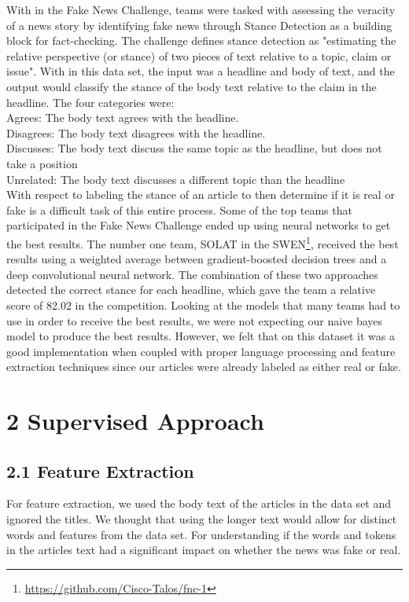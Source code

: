 \documentclass{neu_handout}
\begin{document}
With in the Fake News Challenge, teams were tasked with assessing the veracity of a news story by identifying fake news through Stance Detection as a building block for fact-checking. The challenge defines stance detection as "estimating the relative perspective (or stance) of two pieces of text relative to a topic, claim or issue". With in this data set, the input was a headline and body of text, and the output would classify the stance of the body text relative to the claim in the headline. The four categories were:\\
Agrees: The body text agrees with the headline.\\
Disagrees: The body text disagrees with the headline.\\
Discusses: The body text discuss the same topic as the headline, but does not take a position\\
Unrelated: The body text discusses a different topic than the headline\\

With respect to labeling the stance of an article to then determine if it is real or fake is a difficult task of this entire process. Some of the top teams that participated in the Fake News Challenge ended up using neural networks to get the best results. The number one team, SOLAT in the SWEN\footnote{\url{https://github.com/Cisco-Talos/fnc-1}}, received the best results using a weighted average between gradient-boosted decision trees and a deep convolutional neural network. The combination of these two approaches detected the correct stance for each headline, which gave the team a relative score of 82.02 in the competition. Looking at the models that many teams had to use in order to receive the best results, we were not expecting our naive bayes model to produce the best results. However, we felt that on this dataset it was a good implementation when coupled with proper language processing and feature extraction techniques since our articles were already labeled as either real or fake.

\section*{2 Supervised Approach}

\subsection*{2.1 Feature Extraction}

For feature extraction, we used the body text of the articles in the data set and ignored the titles. We thought that using the longer text would allow for distinct words and features from the data set. For understanding if the words and tokens in the articles text had a significant impact on whether the news was fake or real.\\
\end{document}
